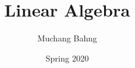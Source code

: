 \documentclass{article}
\begin{document}
\title{Linear Algebra}
\author{Muchang Bahng}
\date{Spring 2020}

\maketitle
\tableofcontents
\pagebreak











\end{document}
